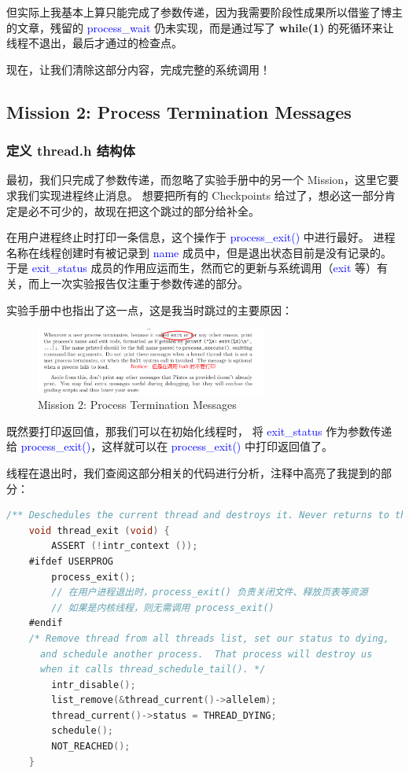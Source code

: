 \documentclass[14pt,a4paper,UTF8,twoside]{article}
\renewcommand{\texttt}[1]{\textcolor{blue}{\ttfamily #1}}
\begin{document}
但实际上我基本上算只能完成了参数传递，因为我需要阶段性成果所以借鉴了博主的文章，残留的 \texttt{process\_wait} 仍未实现，而是通过写了 \textbf{while(1)} 的死循环来让线程不退出，最后才通过的检查点。

现在，让我们清除这部分内容，完成完整的系统调用！

\subsection{Mission 2: Process Termination Messages}

\subsubsection{定义 thread.h 结构体}

最初，我们只完成了参数传递，而忽略了实验手册中的另一个 Mission，这里它要求我们实现进程终止消息。
想要把所有的 Checkpoints 给过了，想必这一部分肯定是必不可少的，故现在把这个跳过的部分给补全。

在用户进程终止时打印一条信息，这个操作于 \texttt{process\_exit()} 中进行最好。
进程名称在线程创建时有被记录到 \texttt{name} 成员中，但是退出状态目前是没有记录的。
于是 \texttt{exit\_status} 成员的作用应运而生，然而它的更新与系统调用（\texttt{exit} 等）有关，而上一次实验报告仅注重于参数传递的部分。

实验手册中也指出了这一点，这是我当时跳过的主要原因：

\begin{figure}[H]
    \centering
    \includegraphics[width=0.68\textwidth]{img6/todo.png}
    \caption{Mission 2: Process Termination Messages}
    \label{fig:lab6-2}
\end{figure}

既然要打印返回值，那我们可以在初始化线程时，
将 \texttt{exit\_status} 作为参数传递给 \texttt{process\_exit()}，这样就可以在 \texttt{process\_exit()} 中打印返回值了。

线程在退出时，我们查阅这部分相关的代码进行分析，注释中高亮了我提到的部分：

\begin{lstlisting}[language=C, title = thread\_exit()]
    /** Deschedules the current thread and destroys it. Never returns to the caller. */
    void thread_exit (void) {
        ASSERT (!intr_context ());
    #ifdef USERPROG
        process_exit();
        // 在用户进程退出时，process_exit() 负责关闭文件、释放页表等资源
        // 如果是内核线程，则无需调用 process_exit()
    #endif
    /* Remove thread from all threads list, set our status to dying,
      and schedule another process.  That process will destroy us
      when it calls thread_schedule_tail(). */
        intr_disable();
        list_remove(&thread_current()->allelem);
        thread_current()->status = THREAD_DYING;
        schedule();
        NOT_REACHED();
    }
\end{lstlisting}
\end{document}
